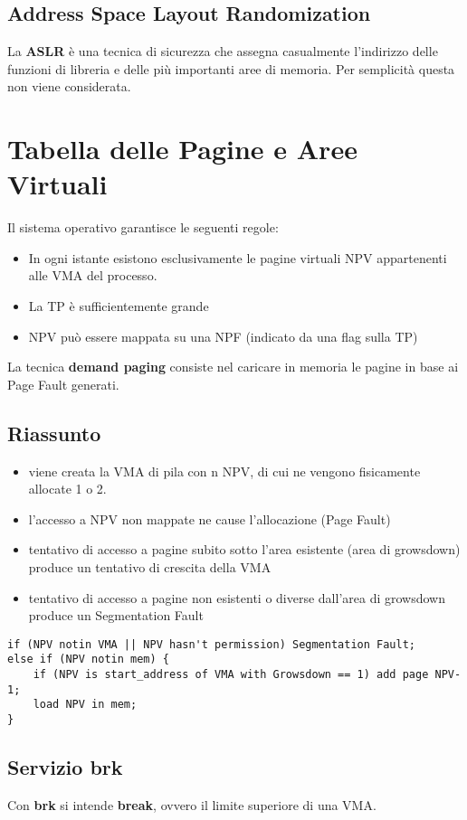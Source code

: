 \documentclass[12pt, a4paper]{report}
\begin{document}
\subsection{Address Space Layout Randomization}
La \textbf{ASLR} è una tecnica di sicurezza che assegna casualmente l'indirizzo
delle funzioni di libreria e delle più importanti aree di memoria. Per
semplicità questa non viene considerata.

\section{Tabella delle Pagine e Aree Virtuali}
Il sistema operativo garantisce le seguenti regole:
\begin{itemize}
	\item In ogni istante esistono esclusivamente le pagine virtuali NPV
		appartenenti alle VMA del processo.
	\item La TP è sufficientemente grande
	\item NPV può essere mappata su una NPF (indicato da una flag sulla TP)
\end{itemize}
La tecnica \textbf{demand paging} consiste nel caricare in memoria le pagine in
base ai Page Fault generati.
\subsection{Riassunto}
\begin{itemize}
	\item viene creata la VMA di pila con n NPV, di cui ne vengono fisicamente
		allocate 1 o 2.
	\item l'accesso a NPV non mappate ne cause l'allocazione (Page Fault)
	\item tentativo di accesso a pagine subito sotto l'area esistente (area di
		growsdown) produce un tentativo di crescita della VMA
	\item tentativo di accesso a pagine non esistenti o diverse dall'area di
		growsdown produce un Segmentation Fault
\end{itemize}

\begin{verbatim}
if (NPV notin VMA || NPV hasn't permission) Segmentation Fault;
else if (NPV notin mem) {
    if (NPV is start_address of VMA with Growsdown == 1) add page NPV-1;
    load NPV in mem;
}
\end{verbatim}
\subsection{Servizio brk}
Con \textbf{brk} si intende \textbf{break}, ovvero il limite superiore di una
VMA.
\end{document}
